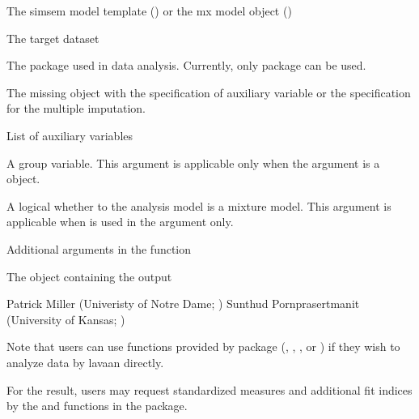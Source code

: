 \documentclass[a4paper]{book}
\begin{document}
%
\begin{Arguments}
\begin{ldescription}
\item[\code{model}] 
The simsem model template () or the mx model object ()

\item[\code{data}] 
The target dataset 

\item[\code{package}] 
The package used in data analysis. Currently, only  package can be used.

\item[\code{miss}]  
The missing object with the specification of auxiliary variable or the specification for the multiple imputation.

\item[\code{aux}]  
List of auxiliary variables

\item[\code{group}]  
A group variable. This argument is applicable only when the  argument is a  object.

\item[\code{mxMixture}] 
A logical whether to the analysis model is a mixture model. This argument is applicable when  is used in the  argument only.

\item[\code{...}]  
Additional arguments in the  function

\end{ldescription}
\end{Arguments}
%
\begin{Value}
The  object containing the output
\end{Value}
%
\begin{Author}\relax
Patrick Miller (Univeristy of Notre Dame; )
Sunthud Pornprasertmanit (University of Kansas; )
\end{Author}
%
\begin{SeeAlso}\relax
Note that users can use functions provided by  package (, , , or ) if they wish to analyze data by lavaan directly. 

For the  result, users may request standardized measures and additional fit indices by the  and  functions in the  package.
\end{SeeAlso}
\end{document}
